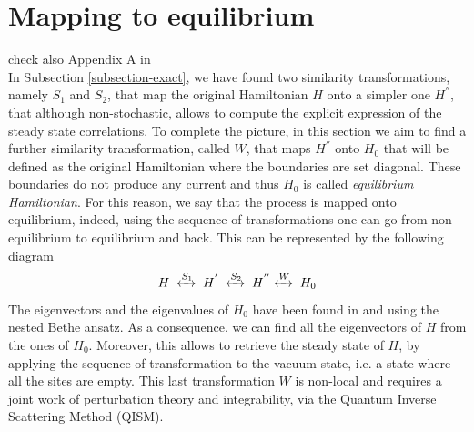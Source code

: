 \documentclass[10pt]{article}
\numberwithin{equation}{section}
\numberwithin{equation}{subsection}
\begin{document}
\section{Mapping to equilibrium} \label{Section-Mapping}
{\color{blue}check also Appendix A in
\cite{Alcaraz:1992zc} \cite{Sklyanin:1988yz}} \\
In Subsection \ref{subsection-exact}, we have found two similarity transformations, namely $S_{1}$ and $S_{2}$, that map the original Hamiltonian $H$ onto a simpler one $H^{''}$, that although non-stochastic, allows to compute the explicit expression of the steady state correlations. To complete the picture, in this section we aim to find a further similarity transformation, called $W$, that maps $H^{''}$ onto $H_{0}$ that will be defined as the original Hamiltonian where the boundaries are set diagonal. These boundaries do not produce any current and thus $H_{0}$ is called \textit{equilibrium Hamiltonian}. For this reason, we say that the process is mapped onto equilibrium, indeed, using the sequence of transformations one can go from non-equilibrium to equilibrium and back.
This can be represented by the following diagram 
\begin{equation}
	H\;\xleftrightarrow{S_{1}}\;H^{'}\;\xleftrightarrow{S_{2}}\;H^{''}\xleftrightarrow{W}\;H_{0}
\end{equation} 
The eigenvectors and the eigenvalues of $H_{0}$ have been found in \cite{belliard2} and \cite{belliard2011nested} using the nested Bethe ansatz. 
As a consequence, we can find all the eigenvectors of $H$ from the ones of $H_{0}$. Moreover, this allows to retrieve the steady state of $H$, by applying the sequence of transformation to the vacuum state, i.e. a state where all the sites are empty. This last transformation $W$ is non-local and requires a joint work of perturbation theory and integrability, via the Quantum Inverse Scattering Method (QISM). 
\end{document}
